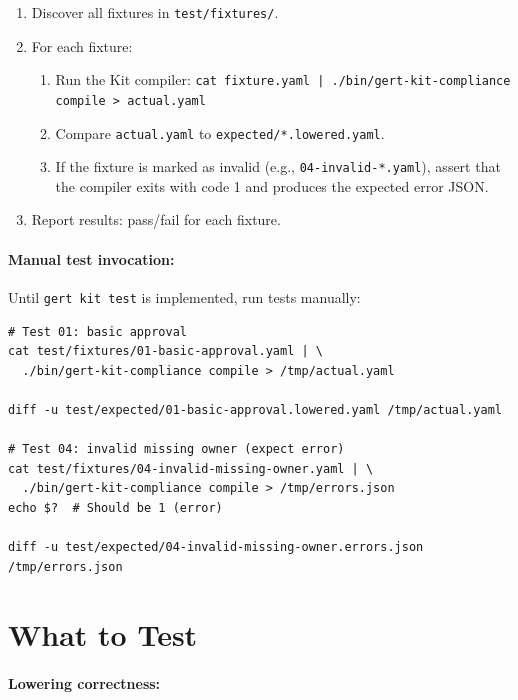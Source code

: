 \begin{enumerate}
  \item Discover all fixtures in \texttt{test/fixtures/}.
  \item For each fixture:
    \begin{enumerate}
      \item Run the Kit compiler: \texttt{cat fixture.yaml | ./bin/gert-kit-compliance compile > actual.yaml}
      \item Compare \texttt{actual.yaml} to \texttt{expected/*.lowered.yaml}.
      \item If the fixture is marked as invalid (e.g., \texttt{04-invalid-*.yaml}), assert that the compiler exits with code 1 and produces the expected error JSON.
    \end{enumerate}
  \item Report results: pass/fail for each fixture.
\end{enumerate}

\paragraph{Manual test invocation:}

Until \texttt{gert kit test} is implemented, run tests manually:

\begin{verbatim}
# Test 01: basic approval
cat test/fixtures/01-basic-approval.yaml | \
  ./bin/gert-kit-compliance compile > /tmp/actual.yaml

diff -u test/expected/01-basic-approval.lowered.yaml /tmp/actual.yaml

# Test 04: invalid missing owner (expect error)
cat test/fixtures/04-invalid-missing-owner.yaml | \
  ./bin/gert-kit-compliance compile > /tmp/errors.json
echo $?  # Should be 1 (error)

diff -u test/expected/04-invalid-missing-owner.errors.json /tmp/errors.json
\end{verbatim}

\section{What to Test}
\label{sec:what-to-test}

\paragraph{Lowering correctness:}

